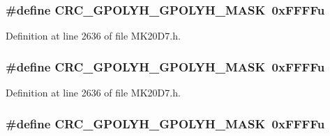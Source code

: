\subsubsection[{\texorpdfstring{C\+R\+C\+\_\+\+G\+P\+O\+L\+Y\+H\+\_\+\+G\+P\+O\+L\+Y\+H\+\_\+\+M\+A\+SK}{CRC_GPOLYH_GPOLYH_MASK}}]{\setlength{\rightskip}{0pt plus 5cm}\#define C\+R\+C\+\_\+\+G\+P\+O\+L\+Y\+H\+\_\+\+G\+P\+O\+L\+Y\+H\+\_\+\+M\+A\+SK~0x\+F\+F\+F\+Fu}\hypertarget{group___c_r_c___register___masks_ga15ab1d296a857eebfbb3e5894ddd9302}{}\label{group___c_r_c___register___masks_ga15ab1d296a857eebfbb3e5894ddd9302}


Definition at line 2636 of file M\+K20\+D7.\+h.

\subsubsection[{\texorpdfstring{C\+R\+C\+\_\+\+G\+P\+O\+L\+Y\+H\+\_\+\+G\+P\+O\+L\+Y\+H\+\_\+\+M\+A\+SK}{CRC_GPOLYH_GPOLYH_MASK}}]{\setlength{\rightskip}{0pt plus 5cm}\#define C\+R\+C\+\_\+\+G\+P\+O\+L\+Y\+H\+\_\+\+G\+P\+O\+L\+Y\+H\+\_\+\+M\+A\+SK~0x\+F\+F\+F\+Fu}\hypertarget{group___c_r_c___register___masks_ga15ab1d296a857eebfbb3e5894ddd9302}{}\label{group___c_r_c___register___masks_ga15ab1d296a857eebfbb3e5894ddd9302}


Definition at line 2636 of file M\+K20\+D7.\+h.

\subsubsection[{\texorpdfstring{C\+R\+C\+\_\+\+G\+P\+O\+L\+Y\+H\+\_\+\+G\+P\+O\+L\+Y\+H\+\_\+\+M\+A\+SK}{CRC_GPOLYH_GPOLYH_MASK}}]{\setlength{\rightskip}{0pt plus 5cm}\#define C\+R\+C\+\_\+\+G\+P\+O\+L\+Y\+H\+\_\+\+G\+P\+O\+L\+Y\+H\+\_\+\+M\+A\+SK~0x\+F\+F\+F\+Fu}\hypertarget{group___c_r_c___register___masks_ga15ab1d296a857eebfbb3e5894ddd9302}{}\label{group___c_r_c___register___masks_ga15ab1d296a857eebfbb3e5894ddd9302}


